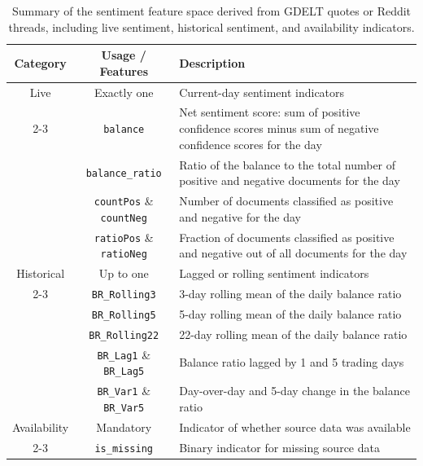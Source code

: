 \begin{table}[ht]
\centering
\caption{Summary of the sentiment feature space derived from GDELT quotes or Reddit threads, including live sentiment, historical sentiment, and availability indicators.}
\label{tab:feature_categories_sentiment}
\renewcommand{\arraystretch}{1.2}
\begin{tabular}{|c|c|p{8.5cm}|}
\hline
\textbf{Category} & \textbf{Usage / Features} & \textbf{Description} \\
\hline

Live & Exactly one & Current-day sentiment indicators \\
\cline{2-3}
 & \texttt{balance} & Net sentiment score: sum of positive confidence scores minus sum of negative confidence scores for the day \\
 & \texttt{balance\_ratio} & Ratio of the balance to the total number of positive and negative documents for the day \\
 & \texttt{countPos} \& \texttt{countNeg} & Number of documents classified as positive and negative for the day \\
 & \texttt{ratioPos} \& \texttt{ratioNeg} & Fraction of documents classified as positive and negative out of all documents for the day \\
\hline

Historical & Up to one & Lagged or rolling sentiment indicators \\
\cline{2-3}
 & \texttt{BR\_Rolling3} & 3-day rolling mean of the daily balance ratio \\
 & \texttt{BR\_Rolling5} & 5-day rolling mean of the daily balance ratio \\
 & \texttt{BR\_Rolling22} & 22-day rolling mean of the daily balance ratio \\
 & \texttt{BR\_Lag1} \& \texttt{BR\_Lag5} & Balance ratio lagged by 1 and 5 trading days \\
 & \texttt{BR\_Var1} \& \texttt{BR\_Var5} & Day-over-day and 5-day change in the balance ratio \\
\hline

Availability & Mandatory & Indicator of whether source data was available \\
\cline{2-3}
 & \texttt{is\_missing} & Binary indicator for missing source data \\
\hline

\end{tabular}
\end{table}

